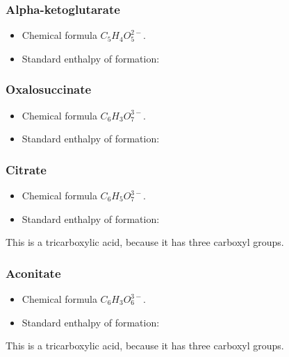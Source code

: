 \documentclass{article}
\begin{document}
\subsubsection{Alpha-ketoglutarate}
\begin{itemize}
    \item Chemical formula $C_5H_4O_5^{2-}$.
    \item Standard enthalpy of formation:
\end{itemize}

\subsubsection{Oxalosuccinate}
\begin{itemize}
    \item Chemical formula $C_6H_3O_7^{3-}$.
    \item Standard enthalpy of formation:
\end{itemize}

\subsubsection{Citrate}
\begin{itemize}
    \item Chemical formula $C_6H_5O_7^{3-}$.
    \item Standard enthalpy of formation:
\end{itemize}
This is a tricarboxylic acid, because it has three carboxyl groups.

\subsubsection{Aconitate}
\begin{itemize}
    \item Chemical formula $C_6H_3O_6^{3-}$.
    \item Standard enthalpy of formation:
\end{itemize}
This is a tricarboxylic acid, because it has three carboxyl groups.
\end{document}
